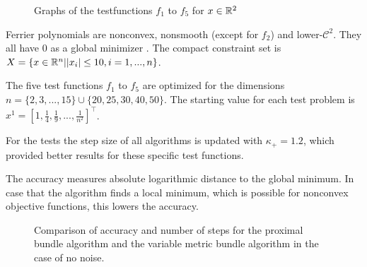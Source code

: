 \begin{figure}[ht]%
	\begin{subfigure}[t]{0.32\textwidth}
	\end{subfigure}
	\begin{subfigure}[t]{0.32\textwidth}
	\end{subfigure}
	\begin{subfigure}[t]{0.32\textwidth}
	\end{subfigure}
	\newline
	\begin{subfigure}{0.47\textwidth}
		\begin{flushright}
		\end{flushright}
		\vfil
	\end{subfigure}
	\begin{subfigure}{0.49\textwidth}
	\end{subfigure}
	\caption[Ferrier polynomials]{Graphs of the testfunctions $f_1$ to $f_5$ for $x\in\mathbb{R}^2$}
	\label{fig_ferr_pol}
\end{figure}

Ferrier polynomials are nonconvex, nonsmooth (except for \(f_2\)) and lower-\(\mathcal{C}^2\). They all have \(0\) as a global minimizer \cite[p. 23]{Hare2016}. The compact constraint set is \(X=\{x \in \mathbb{R}^n|\lvert x_i\rvert \leq 10, i = 1,...,n \}\).

The five test functions \(f_1\) to \(f_5\) are optimized for the dimensions \(n=\{2,3,...,15\} \cup \{20,25,30,40,50\}\).
The starting value for each test problem is \(x^1=[1,\frac{1}{4},\frac{1}{9},...,\frac{1}{n^2}]^{\top}\).

For the tests the step size of all algorithms is updated with \(\kappa_+ = 1.2\), which provided better results for these specific test functions.

The accuracy measures absolute logarithmic distance to the global minimum. In case that the algorithm finds a local minimum, which is possible for nonconvex objective functions, this lowers the accuracy.


\begin{figure}[ht]%
	\begin{subfigure}{0.49\textwidth}
	\end{subfigure}
	\begin{subfigure}{0.49\textwidth}
	\end{subfigure}
	\caption[Accuracy and number of steps: no noise]{Comparison of accuracy and number of steps for the proximal bundle algorithm and the variable metric bundle algorithm in the case of no noise.}
	\label{fig_no_noise}
\end{figure}

